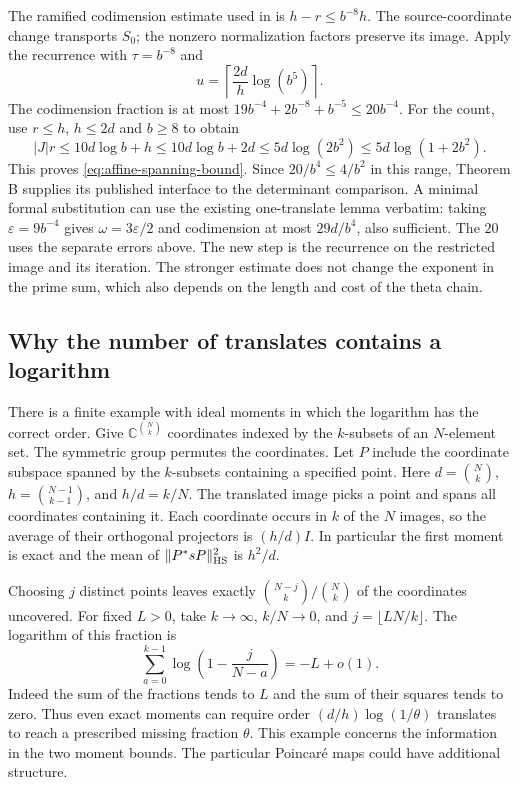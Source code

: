 The ramified codimension estimate used in
 is
$h-r\le b^{-8}h$. The source-coordinate change transports $S_0$;
the nonzero normalization factors preserve its image. Apply the
recurrence with $\tau=b^{-8}$ and
\[
        u=\left\lceil\frac{2d}{h}\log(b^5)\right\rceil .
\]
The codimension fraction is at most $19b^{-4}+2b^{-8}+b^{-5}\le20b^{-4}$. For the count, use $r\le h$, $h\le2d$ and $b\ge8$ to obtain
\[
 |J|r\le 10d\log b+h\le 10d\log b+2d
 \le 5d\log(2b^2)\le5d\log(1+2b^2).
\]
This proves \eqref{eq:affine-spanning-bound}. Since
$20/b^4\le4/b^2$ in this range, Theorem B supplies its published
interface to the determinant comparison. A minimal formal substitution can use the existing one-translate lemma verbatim: taking $\varepsilon=9b^{-4}$ gives $\omega=3\varepsilon/2$ and codimension at most $29d/b^4$, also sufficient. The $20$ uses the separate errors above. The new step is the recurrence on
the restricted image and its iteration. The stronger estimate does
not change the exponent in the prime sum, which also depends on the
length and cost of the theta chain.

\subsection*{Why the number of translates contains a logarithm}

There is a finite example with ideal moments in which the logarithm
has the correct order. Give $\mathbb C^{\binom Nk}$ coordinates indexed
by the $k$-subsets of an $N$-element set. The symmetric group permutes
the coordinates. Let $P$ include the coordinate subspace spanned by
the $k$-subsets containing a specified point. Here $d=\binom Nk$,
$h=\binom{N-1}{k-1}$, and $h/d=k/N$. The translated image picks a
point and spans all coordinates containing it. Each coordinate occurs
in $k$ of the $N$ images, so the average of their orthogonal projectors
is $(h/d)I$. In particular the first moment is exact and the mean of
$\|P^*sP\|_{\rm HS}^2$ is $h^2/d$.

Choosing $j$ distinct points leaves exactly
$\binom{N-j}{k}/\binom Nk$ of the coordinates uncovered. For fixed $L>0$,
take $k\to\infty$, $k/N\to0$, and $j=\lfloor LN/k\rfloor$. The logarithm
of this fraction is
\[
 \sum_{a=0}^{k-1}\log\left(1-\frac{j}{N-a}\right)=-L+o(1).
\]
Indeed the sum of the fractions tends to $L$ and the sum of their
squares tends to zero. Thus even exact moments can require order
$(d/h)\log(1/\theta)$ translates to reach a prescribed missing
fraction $\theta$. This example concerns the information in the two
moment bounds. The particular Poincar\'e maps could have additional
structure.

